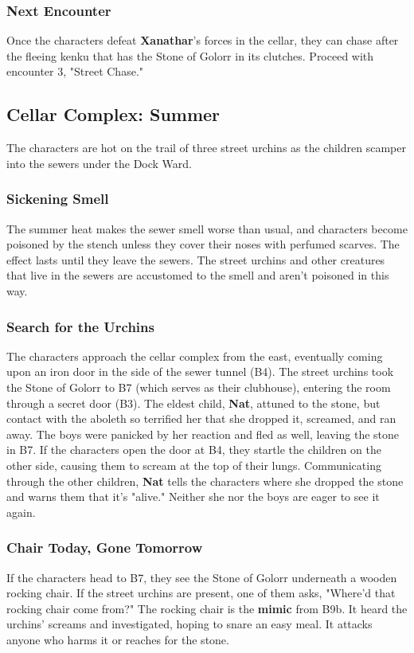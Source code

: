 \documentclass[10pt,a4paper,twoside,twocolumn,openany,nodeprecatedcode]{dndbook}
\begin{document}
\subsubsection{Next Encounter}
Once the characters defeat \textbf{Xanathar}'s forces in the cellar, they can chase after the fleeing kenku that has the Stone of Golorr in its clutches. Proceed with encounter 3, "Street Chase."
\subsection{Cellar Complex: Summer}
The characters are hot on the trail of three street urchins as the children scamper into the sewers under the Dock Ward.
\subsubsection{Sickening Smell}
The summer heat makes the sewer smell worse than usual, and characters become poisoned by the stench unless they cover their noses with perfumed scarves. The effect lasts until they leave the sewers. The street urchins and other creatures that live in the sewers are accustomed to the smell and aren't poisoned in this way.
\subsubsection{Search for the Urchins}
The characters approach the cellar complex from the east, eventually coming upon an iron door in the side of the sewer tunnel (B4).
The street urchins took the Stone of Golorr to B7 (which serves as their clubhouse), entering the room through a secret door (B3). The eldest child, \textbf{Nat}, attuned to the stone, but contact with the aboleth so terrified her that she dropped it, screamed, and ran away. The boys were panicked by her reaction and fled as well, leaving the stone in B7. If the characters open the door at B4, they startle the children on the other side, causing them to scream at the top of their lungs.
Communicating through the other children, \textbf{Nat} tells the characters where she dropped the stone and warns them that it's "alive." Neither she nor the boys are eager to see it again.
\subsubsection{Chair Today, Gone Tomorrow}
If the characters head to B7, they see the Stone of Golorr underneath a wooden rocking chair. If the street urchins are present, one of them asks, "Where'd that rocking chair come from?"
The rocking chair is the \textbf{mimic} from B9b. It heard the urchins' screams and investigated, hoping to snare an easy meal. It attacks anyone who harms it or reaches for the stone.
\end{document}
